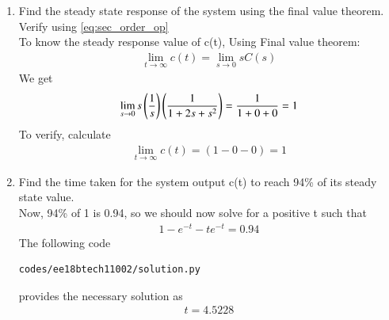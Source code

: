 \begin{enumerate}[label=\thesection.\arabic*.,ref=\thesection.\theenumi]
\begin{figure}
\caption{}
\label{fig:sec_order}
\end{figure}
\item Find the steady state response of the system using the final value theorem.  Verify using 
\ref{eq:sec_order_op}
\\
\solution 
To know the steady response value of c(t), Using Final value theorem:
\begin{align}
\lim_{t\to\infty} c(t) = \lim_{s\to 0} sC(s) 
\end{align}
We get
\begin{align}
\lim_{s\to 0} s \left(\frac{1}{s}\right)\left(\frac{1}{1+2s+s^2}\right) = \frac{1}{1+0+0} = 1
\end{align}
To verify, calculate
\begin{align}
\lim_{t\to\infty} c(t) = (1-0-0) = 1 
\end{align}
\item Find the time taken for the system output c(t) to reach 94\% of its steady state value.
\\
\solution 
Now, 94\% of 1 is 0.94, so we should now solve for a positive t such that
\begin{align}
1 - e^{-t} - te^{-t} = 0.94
\end{align}
The following code 
%
\begin{lstlisting}
codes/ee18btech11002/solution.py
\end{lstlisting}
%
provides the necessary solution as 
\begin{align}
 t = 4.5228
\end{align}

\end{enumerate}
